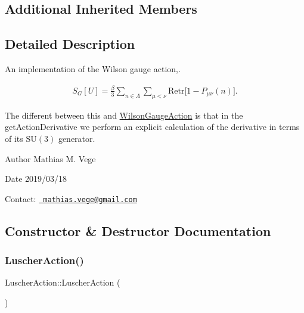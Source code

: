 \subsection*{Additional Inherited Members}


\subsection{Detailed Description}
An implementation of the Wilson gauge action,. 

\begin{eqnarray*} S_G[U] = \frac{\beta}{3} \sum_{n\in\Lambda} \sum_{\mu<\nu} \mathrm{Re} \mathrm{tr} \big[ 1 - P_{\mu\nu}(n) \big]. \end{eqnarray*}

The different between this and \mbox{\hyperlink{class_wilson_gauge_action}{Wilson\+Gauge\+Action}} is that in the get\+Action\+Derivative we perform an explicit calculation of the derivative in terms of its $\mathrm{SU}(3)$ generator.

\begin{DoxyAuthor}{Author}
Mathias M. Vege
\end{DoxyAuthor}
\begin{DoxyDate}{Date}
2019/03/18
\end{DoxyDate}
Contact\+: \href{mailto:mathias.vege@gmail.com}{\texttt{ mathias.\+vege@gmail.\+com}} 

\subsection{Constructor \& Destructor Documentation}
\mbox{\label{class_luscher_action_a2389aab5b35b4c5ccb0ae5a45f68430b}} 
\subsubsection{\texorpdfstring{LuscherAction()}{LuscherAction()}}
{\footnotesize\ttfamily Luscher\+Action\+::\+Luscher\+Action (\begin{DoxyParamCaption}{ }\end{DoxyParamCaption})}

